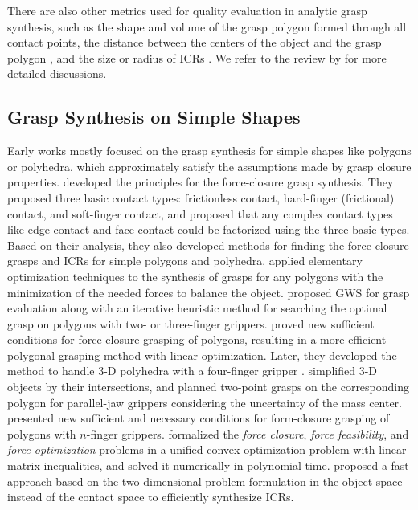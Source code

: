 \documentclass[letterpaper,10pt]{article}
\begin{document}
There are also other metrics used for quality evaluation in analytic grasp synthesis, such as 
the shape \cite{park1992grasp, kim2001optimal} and volume \cite{mirtich1994easily, chinellato2003ranking, supuk2005estimation} of the grasp polygon formed through all contact points, the distance between the centers of the object and the grasp polygon \cite{ponce1997computing, ding2001computation, chinellato2005visual}, and the size or radius of ICRs \cite{stam1992system, ponce1995computing, cornelia2005determining}.
We refer to the review by \cite{roa2015grasp} for more detailed discussions.

\subsection{Grasp Synthesis on Simple Shapes}
\label{sec:hard-grasp-simple}

Early works mostly focused on the grasp synthesis for simple shapes like polygons or polyhedra, which approximately satisfy the assumptions made by grasp closure properties.
\cite{nguyen1988constructing} developed the principles for the force-closure grasp synthesis. They proposed three basic contact types: frictionless contact, hard-finger (frictional) contact, and soft-finger contact, and proposed that any complex contact types like edge contact and face contact could be factorized using the three basic types.
Based on their analysis, they also developed methods for finding the force-closure grasps and ICRs for simple polygons and polyhedra.
\cite{markenscoff1989optimum} applied elementary optimization techniques to the synthesis of grasps for any polygons with the minimization of the needed forces to balance the object.
\cite{ferrari1992planning} proposed GWS for grasp evaluation along with an iterative heuristic method for searching the optimal grasp on polygons with two- or three-finger grippers.
\cite{ponce1995computing} proved new sufficient conditions for force-closure grasping of polygons, resulting in a more efficient polygonal grasping method with linear optimization.
Later, they developed the method to handle 3-D polyhedra with a four-finger gripper \cite{ponce1997computing}.
\cite{smith1999computing} simplified 3-D objects by their intersections, and planned two-point grasps on the corresponding polygon for parallel-jaw grippers considering the uncertainty of the mass center.
\cite{liu2000computing} presented new sufficient and necessary conditions for form-closure grasping of polygons with $n$-finger grippers.
\cite{han2000grasp} formalized the {\it force closure}, {\it force feasibility}, and {\it force optimization} problems in a unified convex optimization problem with linear matrix inequalities, and solved it numerically in polynomial time.
\cite{cornella2005fast} proposed a fast approach based on the two-dimensional problem formulation in the object space instead of the contact space to efficiently synthesize ICRs.
\end{document}

